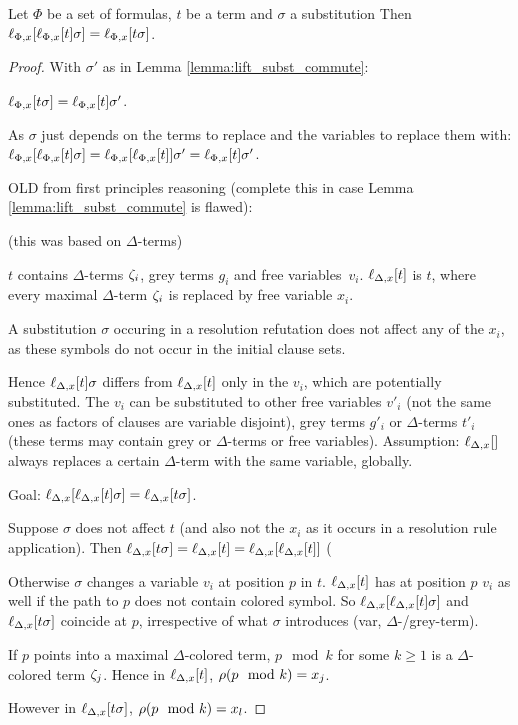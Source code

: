 \documentclass[,%
	paper=a4,%
	DIV14, 
	liststotoc,
	bibtotoc,
	draft=false,%
	numbers=noendperiod
]{scrartcl}
\begin{document}
\begin{lemma}
  Let $\Phi$ be a set of formulas, $t$ be a term and $\sigma$ a substitution
  Then
  $\ell_{\Phi,x}[\ell_{\Phi,x}[t] \sigma] = \ell_{\Phi,x}[t\sigma]$.
  \label{lemma:lift_multiple_times}
\end{lemma}
\begin{proof}

  With $\sigma'$ as in Lemma \ref{lemma:lift_subst_commute}:

  $\ell_{\Phi,x}[t\sigma] = \ell_{\Phi,x}[t]\sigma'$.

  As $\sigma$ just depends on the terms to replace and the variables to replace them with:
  \newline
  $\ell_{\Phi,x}[\ell_{\Phi,x}[t]\sigma] = \ell_{\Phi,x}[\ell_{\Phi,x}[t]]\sigma' = \ell_{\Phi,x}[t]\sigma' $. \qedhere

  OLD from first principles reasoning (complete this in case Lemma \ref{lemma:lift_subst_commute}{} is flawed):

  {

    \tiny

    (this was based on $\Delta$-terms)

  $t$ contains $\Delta$-terms $\zeta_{i}$, grey terms $g_i$ and free variables~$v_i$.
  $\ell_{\Delta,x}[t]$ is $t$, where every maximal $\Delta$-term $\zeta_{i}$ is replaced by free variable $x_i$.

  A substitution $\sigma$ occuring in a resolution refutation does not affect any of the $x_i$, as these symbols do not occur   in the initial clause sets.

  Hence $\ell_{\Delta,x}[t] \sigma $ differs from $\ell_{\Delta,x}[t]$ only in the $v_i$, which are potentially substituted.
  The $v_i$ can be substituted to other free variables $v'_i$ (not the same ones as factors of clauses are variable disjoint),  grey terms $g'_i$ or $\Delta$-terms $t'_i$ (these terms may contain grey or $\Delta$-terms or free variables).
 Assumption: $\lifdelta$ always replaces a certain $\Delta$-term with the same variable, globally.

  Goal: $\ell_{\Delta,x}[\ell_{\Delta,x}[t] \sigma] = \ell_{\Delta,x}[t\sigma]$.

  Suppose $\sigma$ does not affect $t$ (and also not the $x_i$ as it occurs in a resolution rule application).
  Then $\ell_{\Delta,x}[t\sigma] = \ell_{\Delta,x}[t] = \ell_{\Delta,x}[\ell_{\Delta,x}[t]]$ (

  Otherwise $\sigma$ changes a variable $v_i$ at position $p$ in $t$.
  $\ell_{\Delta,x}[t]$ has at position $p$ $v_i$ as well if the path to $p$ does not contain colored symbol.
  So $\ell_{\Delta,x}[\ell_{\Delta,x}[t]\sigma]$ and $\ell_{\Delta,x}[t\sigma]$ coincide at $p$, irrespective of what $\sigma$ introduces (var,   $\Delta$-/grey-term).

  If $p$ points into a maximal $\Delta$-colored term, $p\mod k$ for some $k\geq 1$ is a $\Delta$-colored term $\zeta_{j}$.
  Hence in $\ell_{\Delta,x}[t]$, $\operatorname{{\rho}}(p\mod k) = x_j$.

  However in $\ell_{\Delta,x}[t\sigma]$, $\operatorname{{\rho}}(p\mod k) = x_l$.
}
\end{proof}
\end{document}
